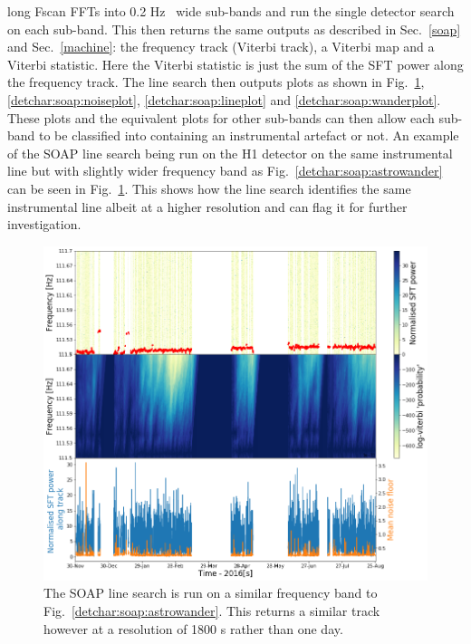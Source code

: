 long Fscan \glspl{FFT} into 0.2 Hz~ wide sub-bands and run the single detector
search on each sub-band.  This then returns the same outputs as described in
Sec.~\ref{soap} and Sec.~\ref{machine}: the frequency track (Viterbi track), a
Viterbi map and a Viterbi statistic.  Here the Viterbi statistic is just the
sum of the \gls{SFT} power along the frequency track.  The line search then
outputs plots as shown in Fig.~\ref{detchar:soap:linewander},
\ref{detchar:soap:noiseplot}, \ref{detchar:soap:lineplot} and
\ref{detchar:soap:wanderplot}.  These plots and the equivalent plots for other
sub-bands can then allow each sub-band to be classified into containing an
instrumental artefact or not.  An example of the SOAP line search being run on
the H1 detector on the same instrumental line but with slightly wider frequency
band as Fig.~\ref{detchar:soap:astrowander} can be seen in
Fig.~\ref{detchar:soap:linewander}. This shows how the line search identifies
the same instrumental line albeit at a higher resolution and can flag it for
further investigation.~

%
\begin{figure}
	\centering
	\includegraphics[width=\textwidth]{C5_detchar/track_F111_5_111_7_wander_2.png}
	\caption[Example SOAP output for wandering line]{ The SOAP line search is run on a similar frequency band to Fig.~\ref{detchar:soap:astrowander}. This returns a similar track however at a resolution of 1800 s rather than one day.}
	\label{detchar:soap:linewander}
\end{figure}
%

